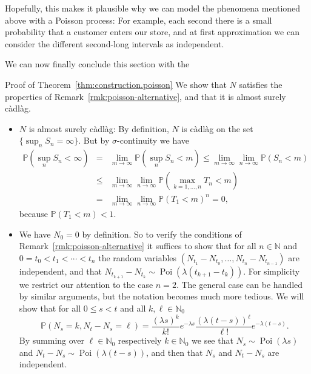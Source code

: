 \documentclass{article}
\newcommand{\tmop}[1]{\ensuremath{\operatorname{#1}}}
\newenvironment{itemizedot}{\begin{itemize} \renewcommand{\labelitemi}{$\bullet$}\renewcommand{\labelitemii}{$\bullet$}\renewcommand{\labelitemiii}{$\bullet$}\renewcommand{\labelitemiv}{$\bullet$}}{\end{itemize}}
\newenvironment{proof*}[1]{\noindent\textbf{#1\ }}{\hspace*{\fill}$\Box$\medskip}
\newcommand{\1}{\mathbbm{1}}
\begin{document}
Hopefully, this makes it plausible why we can model the phenomena mentioned
above with a Poisson process: For example, each second there is a small
probability that a customer enters our store, and at first approximation we
can consider the different second-long intervals as independent.

We can now finally conclude this section with the

\begin{proof*}{Proof of Theorem~\ref{thm:construction.poisson}}
  We show that $N$ satisfies the properties of
  Remark~\ref{rmk:poisson-alternative}, and that it is almost surely
  c{\`a}dl{\`a}g.
  \begin{itemizedot}
    \item $N$ is almost surely c{\`a}dl{\`a}g: By definition, $N$ is
    c{\`a}dl{\`a}g on the set $ \{ \sup_n S_n = \infty \}$. But by
    $\sigma$-continuity we have
    \begin{eqnarray*}
      \mathbb{P} (\sup_n S_n < \infty) & = & \lim_{m \rightarrow \infty}
      \mathbb{P} (\sup_n S_n < m) \leqslant \lim_{m \rightarrow \infty}
      \lim_{n \rightarrow \infty} \mathbb{P} (S_n < m)\\
      & \leqslant & \lim_{m \rightarrow \infty} \lim_{n \rightarrow \infty}
      \mathbb{P} (\max_{k = 1, \ldots, n} T_n < m)\\
      & = & \lim_{m \rightarrow \infty} \lim_{n \rightarrow \infty}
      \mathbb{P} (T_1 < m)^n = 0,
    \end{eqnarray*}
    because $\mathbb{P} (T_1 < m) < 1$.

    \item We have $N_0 = 0$ by definition. So to verify the conditions of
    Remark~\ref{rmk:poisson-alternative} it suffices to show that for all $n
    \in \mathbb{N}$ and $0 = t_0 < t_1 < \cdots < t_n$ the random variables
    $(N_{t_1} - N_{t_0}, \ldots, N_{t_n} - N_{t_{n - 1}})$ are independent,
    and that $N_{t_{k + 1}} - N_{t_k} \sim \tmop{Poi} (\lambda (t_{k + 1} -
    t_k))$. For simplicity we restrict our attention to the case $n = 2$. The
    general case can be handled by similar arguments, but the notation becomes
    much more tedious. We will show that for all $0 \leqslant s < t$ and all
    $k, \ell \in \mathbb{N}_0$
    \[ \mathbb{P} (N_s = k, N_t - N_s = \ell) = \frac{(\lambda s)^k}{k!} e^{-
       \lambda s} \frac{(\lambda (t - s))^{\ell}}{\ell !} e^{- \lambda (t -
       s)} . \]
    By summing over $\ell \in \mathbb{N}_0$ respectively ${k \in \mathbb{N}_0}
    $ we see that $N_s \sim \tmop{Poi} (\lambda s)$ and $N_t - N_s \sim
    \tmop{Poi} (\lambda (t - s))$, and then that $N_s$ and $N_t - N_s$ are
    independent.


\end{itemizedot}
\end{proof*}
\end{document}
